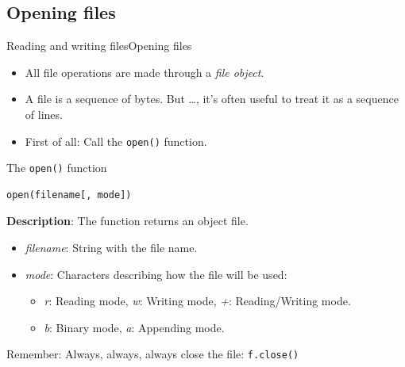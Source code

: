 \documentclass[10pt,compress]{beamer} %
\begin{document}
\subsection{Opening files}
\begin{frame}[fragile]{Reading and writing files}{Opening files}
	\begin{itemize}
	\item \small{All file operations are made through a \textit{file object}.}
	\item \small{A file is a sequence of bytes. But \ldots, it's often useful to treat it as a sequence of lines.} %
	\item \small{First of all: Call the \texttt{open()} function.}
	\end{itemize}

	\begin{block}{The \texttt{open()} function}
\begin{verbatim}
open(filename[, mode])
\end{verbatim}
	\vspace{-0.2cm}
	\textbf{Description}: The function returns an object file.\\
	\vspace{-0.2cm}
	\begin{itemize}
	\item \textit{filename}: String with the file name.
	\item \textit{mode}: Characters describing how the file will be used:
		\begin{itemize}
		\item \textit{r}: Reading mode, \textit{w}: Writing mode,  \textit{+}:  Reading/Writing mode. %
		\item \textit{b}: Binary mode, \textit{a}: Appending mode.
		\end{itemize}
	\end{itemize}
	\end{block}
	\small{\alert{Remember}: Always, always, always close the file: \texttt{f.close()}}
\end{frame}
\end{document}
